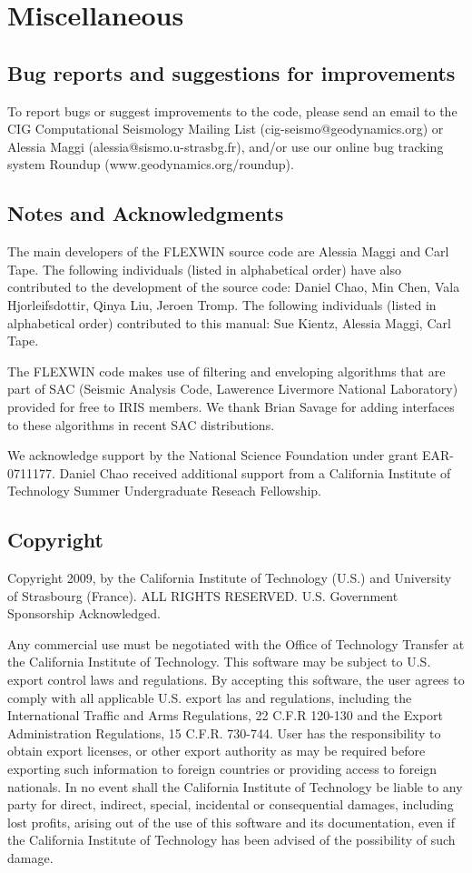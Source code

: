 \chapter{Miscellaneous}

\section{Bug reports and suggestions for improvements}
To report bugs or suggest improvements to the code, please send an email to the CIG Computational Seismology Mailing List (cig-seismo@geodynamics.org) or Alessia Maggi (alessia@sismo.u-strasbg.fr), and/or use our online bug tracking system Roundup (www.geodynamics.org/roundup).

\section{Notes and Acknowledgments}
The main developers of the FLEXWIN source code are Alessia Maggi and Carl Tape.  The following individuals (listed in alphabetical order) have also contributed to the development of the source code: Daniel Chao, Min Chen, Vala Hjorleifsdottir, Qinya Liu, Jeroen Tromp.  The following individuals (listed in alphabetical order) contributed to this manual: Sue Kientz, Alessia Maggi, Carl Tape.

The FLEXWIN code makes use of filtering and enveloping algorithms that are part of SAC (Seismic Analysis Code, Lawerence Livermore National Laboratory) provided for free to IRIS members.  We thank Brian Savage for adding interfaces to these algorithms in recent SAC distributions. 

We acknowledge support by the National Science Foundation under grant EAR-0711177.
Daniel Chao received additional support from a California Institute of Technology Summer Undergraduate Reseach Fellowship.


\section{Copyright}
Copyright 2009, by the California Institute of Technology (U.S.) and University of Strasbourg (France).  ALL RIGHTS RESERVED.  U.S. Government Sponsorship Acknowledged.

Any commercial use must be negotiated with the Office of Technology Transfer at
the California Institute of Technology.  This software may be subject to U.S.
export control laws and regulations.  By accepting this software, the user
agrees to comply with all applicable U.S. export las and regulations, including
the International Traffic and Arms Regulations, 22 C.F.R 120-130 and the Export
Administration Regulations, 15 C.F.R. 730-744.  User has the responsibility to
obtain export licenses, or other export authority as may be required before
exporting such information to foreign countries or providing access to foreign
nationals.  In no event shall the California Institute of Technology be liable
to any party for direct, indirect, special, incidental or consequential
damages, including lost profits, arising out of the use of this software and
its documentation, even if the California Institute of Technology has been
advised of the possibility of such damage.

